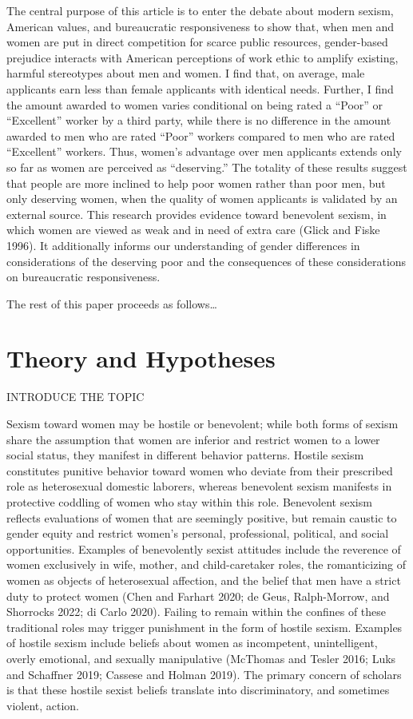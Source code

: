 \documentclass[12pt]{article}%
\begin{document}
\begin{doublespace}
The central purpose of this article is to enter the debate about modern sexism, American values, and bureaucratic responsiveness to show that, when men and women are put in direct competition for scarce public resources, gender-based prejudice interacts with American perceptions of work ethic to amplify existing, harmful stereotypes about men and women. I find that, on average, male applicants earn less than female applicants with identical needs. Further, I find the amount awarded to women varies conditional on being rated a “Poor” or “Excellent” worker by a third party, while there is no difference in the amount awarded to men who are rated “Poor” workers compared to men who are rated “Excellent” workers. Thus, women’s advantage over men applicants extends only so far as women are perceived as “deserving.” The totality of these results suggest that people are more inclined to help poor women rather than poor men, but only deserving women, when the quality of women applicants is validated by an external source. This research provides evidence toward benevolent sexism, in which women are viewed as weak and in need of extra care (Glick and Fiske 1996). It additionally informs our understanding of gender differences in considerations of the deserving poor and the consequences of these considerations on bureaucratic responsiveness.


The rest of this paper proceeds as follows…

\section*{Theory and Hypotheses}
INTRODUCE THE TOPIC

Sexism toward women may be hostile or benevolent; while both forms of sexism share the assumption that women are inferior and restrict women to a lower social status, they manifest in different behavior patterns. Hostile sexism constitutes punitive behavior toward women who deviate from their prescribed role as heterosexual domestic laborers, whereas benevolent sexism manifests in protective coddling of women who stay within this role. Benevolent sexism reflects evaluations of women that are seemingly positive, but remain caustic to gender equity and restrict women's personal, professional, political, and social opportunities. Examples of benevolently sexist attitudes include the reverence of women exclusively in wife, mother, and child-caretaker roles, the romanticizing of women as objects of heterosexual affection, and the belief that men have a strict duty to protect women (Chen and Farhart 2020; de Geus, Ralph-Morrow, and Shorrocks 2022; di Carlo 2020). Failing to remain within the confines of these traditional roles may trigger punishment in the form of hostile sexism. Examples of hostile sexism include beliefs about women as incompetent, unintelligent, overly emotional, and sexually manipulative (McThomas and Tesler 2016; Luks and Schaffner 2019; Cassese and Holman 2019). The primary concern of scholars is that these hostile sexist beliefs translate into discriminatory, and sometimes violent, action.



\end{doublespace}
\end{document}

